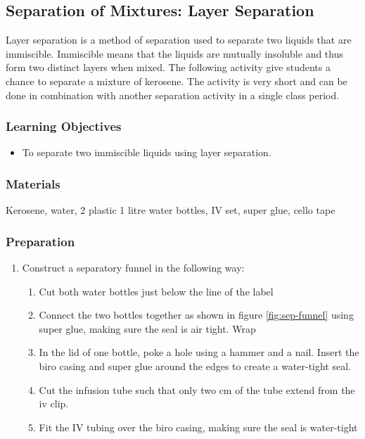 \subsection{Separation of Mixtures: Layer Separation}
Layer separation is a method of separation used to separate two liquids that are immiscible. Immiscible means that the liquids are mutually insoluble and thus form two distinct layers when mixed. The following activity give students a chance to separate a mixture of kerosene. The activity is very short and can be done in combination with another separation activity in a single class period.

\subsubsection*{Learning Objectives}
\begin{itemize}
\item{To separate two immiscible liquids using layer separation.}
\end{itemize}

\subsubsection*{Materials}
Kerosene, water, 2 plastic 1 litre water bottles, IV set, super glue, cello tape

\subsubsection*{Preparation}
\begin{enumerate}
\item{Construct a separatory funnel in the following way:}
\begin{enumerate}
\item{Cut both water bottles just below the line of the label}
\item{Connect the two bottles together as shown in figure \ref{fig:sep-funnel} using super glue, making sure the seal is air tight. Wrap}
\item{In the lid of one bottle, poke a hole using a hammer and a nail. Insert the biro casing and super glue around the edges to create a water-tight seal.}
\item{Cut the infusion tube such that only two cm of the tube extend from the iv clip.}
\item{Fit the IV tubing over the biro casing, making sure the seal is water-tight}
\end{enumerate}
\end{enumerate}

